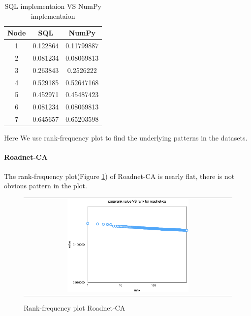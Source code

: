 \begin{table}
\begin{center}
\begin{tabular}{| c | c | c | }
    \hline
    Node & SQL & NumPy \\ \hline
    1 & 0.122864 & 0.11799887 \\ \hline
    2 & 0.081234 & 0.08069813 \\ \hline
    3 & 0.263843 & 0.2526222 \\ \hline
    4 & 0.529185 & 0.52647168 \\ \hline
    5 & 0.452971 & 0.45487423 \\ \hline
    6 & 0.081234 & 0.08069813 \\ \hline
    7 & 0.645657 & 0.65203598 \\ \hline
\end{tabular}
\caption{SQL implementaion VS NumPy implementaion}
\label{t2:verify}
\end{center}
\end{table}

Here We use rank-frequency plot to find the underlying patterns in the datasets. 

\paragraph{Roadnet-CA}
The rank-frequency plot(Figure \ref{t2:ca}) of Roadnet-CA is nearly flat, there is not obvious pattern in the plot.
\begin{figure}[!htbf]
\begin{center}
\begin{tabular}{c}
     \includegraphics[width=0.6\textwidth]{FIG/t2_ca.png}\\
\end{tabular}
\caption{Rank-frequency plot Roadnet-CA}
\label{t2:ca}
\end{center}
\end{figure}

